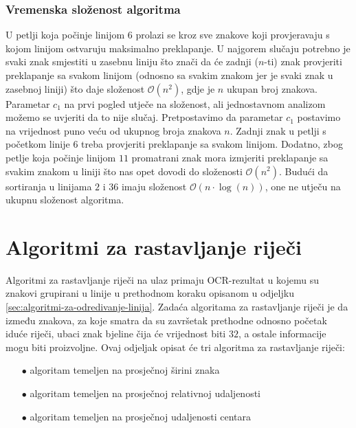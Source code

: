 \documentclass[times, utf8, zavrsni]{fer}
\begin{document}
\subsubsection{Vremenska složenost algoritma}
U petlji koja počinje linijom $6$ prolazi se kroz sve znakove koji provjeravaju
s kojom linijom ostvaruju maksimalno preklapanje. U najgorem slučaju potrebno je
svaki znak smjestiti u zasebnu liniju što znači da će zadnji ($n$-ti) znak
provjeriti preklapanje sa svakom linijom (odnosno sa svakim znakom jer je svaki
znak u zasebnoj liniji) što daje složenost $\mathcal{O}(n^2)$, gdje je $n$
ukupan broj znakova. Parametar $c_1$ na prvi pogled utječe na složenost, ali
jednostavnom analizom možemo se uvjeriti da to nije slučaj. Pretpostavimo da
parametar $c_1$ postavimo na vrijednost puno veću od ukupnog broja znakova $n$.
Zadnji znak u petlji s početkom linije $6$ treba provjeriti preklapanje sa
svakom linijom. Dodatno, zbog petlje koja počinje linijom $11$ promatrani znak
mora izmjeriti preklapanje sa svakim znakom u liniji što nas opet dovodi do
složenosti $\mathcal{O}(n^2)$. Budući da sortiranja u linijama $2$ i $36$ imaju
složenost $\mathcal{O}(n \cdot \log(n))$, one ne utječu na ukupnu složenost
algoritma.








\section{Algoritmi za rastavljanje riječi}
\label{sec:algoritmi-za-rastavljanje-riječi}
Algoritmi za rastavljanje riječi na ulaz primaju OCR-rezultat u kojemu su
znakovi grupirani u linije u prethodnom koraku opisanom u odjeljku
\ref{sec:algoritmi-za-odredivanje-linija}. Zadaća algoritama za rastavljanje
riječi je da između znakova, za koje smatra da su završetak prethodne odnosno
početak iduće riječi, ubaci znak bjeline čija će vrijednost  biti
$32$, a ostale informacije mogu biti proizvoljne.
Ovaj odjeljak opisat će tri algoritma za rastavljanje riječi:
\begin{itemize}
    \item[$\bullet$] algoritam temeljen na prosječnoj širini znaka
    \item[$\bullet$] algoritam temeljen na prosječnoj relativnoj
                     udaljenosti
    \item[$\bullet$] algoritam temeljen na prosječnoj udaljenosti centara
\end{itemize}
\end{document}
